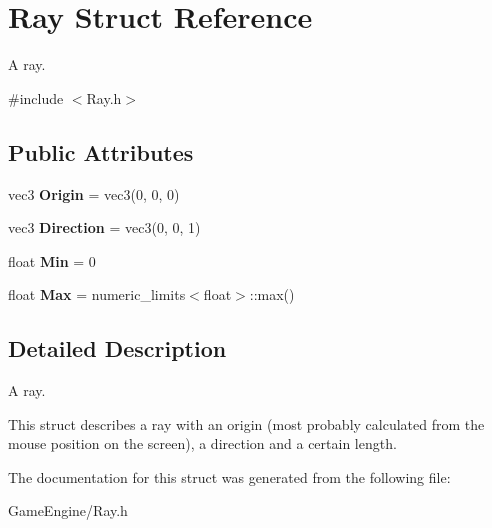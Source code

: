 \section{Ray Struct Reference}
\label{struct_ray}


A ray.  




{\ttfamily \#include $<$Ray.\+h$>$}

\subsection*{Public Attributes}
\begin{DoxyCompactItemize}
\item 
\mbox{\label{struct_ray_afb682da8435bc2132128a8f855971ae3}} 
vec3 {\bfseries Origin} = vec3(0, 0, 0)
\item 
\mbox{\label{struct_ray_a2437bb2eea17f94a46b909e9cfac5842}} 
vec3 {\bfseries Direction} = vec3(0, 0, 1)
\item 
\mbox{\label{struct_ray_aebd05633044067d1bec625496e38bae3}} 
float {\bfseries Min} = 0
\item 
\mbox{\label{struct_ray_a849b8b272ca2f30ed52ccf3e0bb94062}} 
float {\bfseries Max} = numeric\+\_\+limits$<$float$>$\+::max()
\end{DoxyCompactItemize}


\subsection{Detailed Description}
A ray. 

This struct describes a ray with an origin (most probably calculated from the mouse position on the screen), a direction and a certain length. 

The documentation for this struct was generated from the following file\+:\begin{DoxyCompactItemize}
\item 
Game\+Engine/Ray.\+h\end{DoxyCompactItemize}
